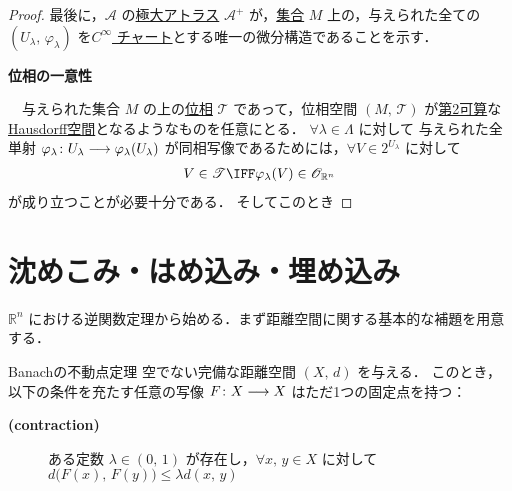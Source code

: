 \documentclass[geometry_main]{subfiles}
\begin{document}
\begin{proof}
	最後に，$\mathcal{A}$ の\hyperref[maxatlas]{極大アトラス} $\mathcal{A}^+$ が，\underline{集合} $M$ 上の，与えられた全ての $(U_\lambda,\, \varphi_\lambda)$ を\hyperref[diffmani]{$C^\infty$ チャート}とする唯一の微分構造であることを示す．

	\item[\textbf{位相の一意性}]　
	
	　与えられた集合 $M$ の上の\hyperref[ax.topo]{位相} $\mathscr{T}$ であって，位相空間 $(M,\, \mathscr{T})$ が\hyperref[def:second-countable]{第2可算}な\hyperref[def:separation]{Hausdorff空間}となるようなものを任意にとる．
	$\forall \lambda \in \Lambda$ に対して
	与えられた全単射 $\varphi_\lambda \colon U_\lambda \longrightarrow \varphi_\lambda(U_\lambda)$ が同相写像であるためには，$\forall V \in 2^{U_\lambda}$ に対して
	\begin{align}
		V \in \mathscr{T} \IFF \varphi_\lambda(V) \in \mathscr{O}_{\mathbb{R}^n}
	\end{align}
	が成り立つことが必要十分である．
	そしてこのとき 
\end{proof}


\section{沈めこみ・はめ込み・埋め込み}

$\mathbb{R}^n$ における逆関数定理から始める．まず距離空間に関する基本的な補題を用意する．

\begin{mylem}[label=lem:contraction]{Banachの不動点定理}
    空でない完備な距離空間 $(X,\, d)$ を与える．
    このとき，以下の条件を充たす任意の写像 $F \colon X \longrightarrow X$ はただ1つの固定点を持つ：
    \begin{description}
        \item[\textbf{(contraction)}]  
        ある定数 $\lambda \in (0,\, 1)$ が存在し，$\forall x,\, y \in X$ に対して $d \bigl( F(x),\, F(y) \bigr) \le \lambda d(x,\, y)$
    \end{description}
\end{mylem}
\end{document}
